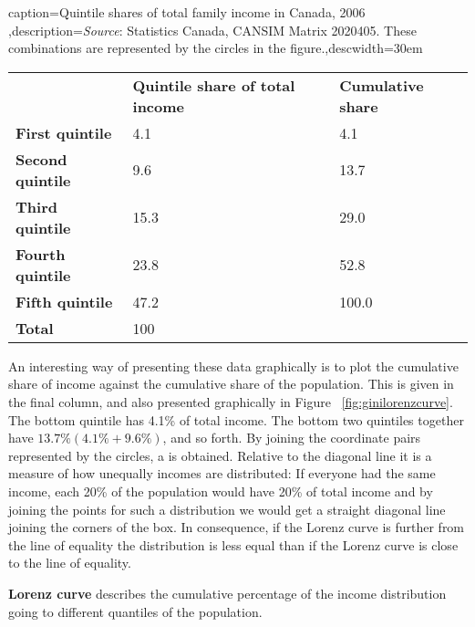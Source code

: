 \begin{Table}{caption={Quintile shares of total family income in Canada, 2006 \label{table:quintileincome}},description={\textit{Source}: Statistics Canada, CANSIM Matrix 2020405. These combinations are represented by the circles in the figure.},descwidth={30em}}
	\begin{tabu} to \linewidth {|X[0.75,c]X[1,c]X[1,c]|} \hline 
			& \textbf{Quintile share of total income} & \textbf{Cumulative share} \\[0.25em]
		\textbf{First quintile}  & 4.1 & 4.1 \\
			\textbf{Second quintile} & 9.6 & 13.7 \\
		\textbf{Third quintile} & 15.3 & 29.0 \\
			\textbf{Fourth quintile} & 23.8 & 52.8 \\ 
		\textbf{Fifth quintile} & 47.2 & 100.0 \\
			\textbf{Total} & 100 &  \\ \hline 
	\end{tabu}
\end{Table}



\newhtmlpage

An interesting way of presenting these data graphically is to plot the
cumulative share of income against the cumulative share of the population.
This is given in the final column, and also presented graphically in Figure~%
\ref{fig:ginilorenzcurve}. The bottom quintile has 4.1\% of total income.
The bottom two quintiles together have $13.7\%(4.1\%+9.6\%)$, and so forth.
By joining the coordinate pairs represented by the circles, a %
 is obtained. Relative to the diagonal line it is
a measure of how unequally incomes are distributed: If everyone had the same
income, each 20\% of the population would have 20\% of total income and by
joining the points for such a distribution we would get a straight diagonal
line joining the corners of the box. In consequence, if the Lorenz curve is
further from the line of equality the distribution is less equal than if the
Lorenz curve is close to the line of equality.

\begin{DefBox}
	\textbf{Lorenz curve} describes the cumulative percentage of the income distribution going to different quantiles of the population.
\end{DefBox}

